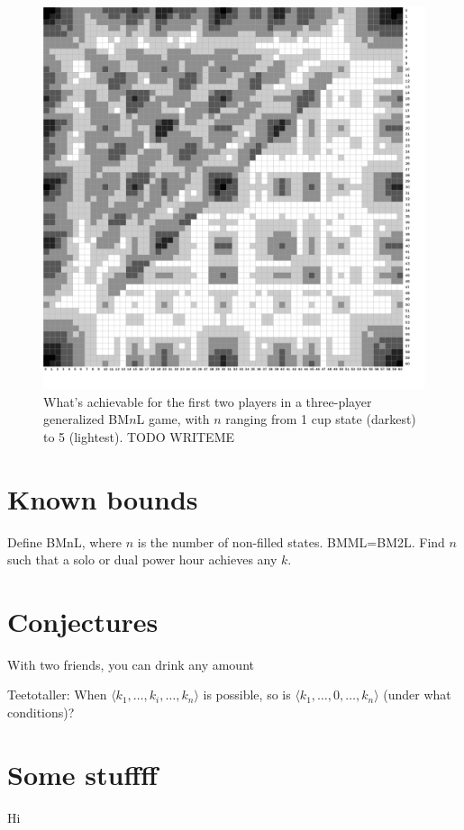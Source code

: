 \documentclass[twocolumn]{article}
\begin{document}
\begin{figure}
\begin{center}
\includegraphics[width=0.90 \linewidth]{composite2playermock.png}
\end{center}\vspace{-0.1in}
\caption{What's achievable for the first two players in a three-player
  generalized BM$n$L game, with $n$ ranging from 1 cup state (darkest)
  to 5 (lightest). TODO WRITEME
}
\label{fig:composite2player}
\end{figure}


\section{Known bounds}

Define BMnL, where $n$ is the number of non-filled states. BMML=BM2L.
Find $n$ such that a solo or dual power hour achieves any $k$.

\section{Conjectures} \label{sec:conjectures}

With two friends, you can drink any amount

Teetotaller: When $\langle k_1, \ldots, k_i, \ldots, k_n \rangle$ is possible,
so is $\langle k_1, \ldots, 0, \ldots, k_n \rangle$ (under what conditions)?

\section{Some stuffff}

Hi




{}

\end{document}
